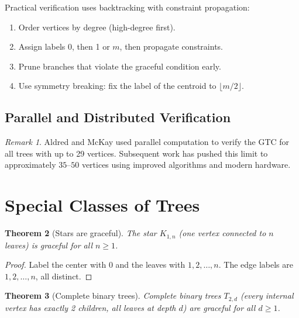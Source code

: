 \documentclass[12pt,a4paper]{amsart}
\newtheorem{theorem}{Theorem}[section]
\theoremstyle{definition}
\theoremstyle{remark}
\newtheorem{remark}[theorem]{Remark}
\begin{document}
Practical verification uses backtracking with constraint propagation:

\begin{enumerate}[label=(\arabic*)]
  \item Order vertices by degree (high-degree first).
  \item Assign labels 0, then 1 or $m$, then propagate constraints.
  \item Prune branches that violate the graceful condition early.
  \item Use symmetry breaking: fix the label of the centroid to $\lfloor m/2 \rfloor$.
\end{enumerate}

\subsection{Parallel and Distributed Verification}

\begin{remark}
Aldred and McKay \cite{AldredMcKay1998} used parallel computation to verify
the GTC for all trees with up to 29 vertices. Subsequent work has pushed this
limit to approximately $35$--$50$ vertices using improved algorithms and modern
hardware.
\end{remark}

\section{Special Classes of Trees}\label{sec:special}

\begin{theorem}[Stars are graceful]\label{thm:stars}
The star $K_{1,n}$ (one vertex connected to $n$ leaves) is graceful for all $n \geq 1$.
\end{theorem}

\begin{proof}
Label the center with $0$ and the leaves with $1, 2, \ldots, n$. The edge labels
are $1, 2, \ldots, n$, all distinct.
\end{proof}

\begin{theorem}[Complete binary trees]\label{thm:binary}
Complete binary trees $T_{2,d}$ (every internal vertex has exactly 2 children,
all leaves at depth $d$) are graceful for all $d \geq 1$.
\end{theorem}
\end{document}
